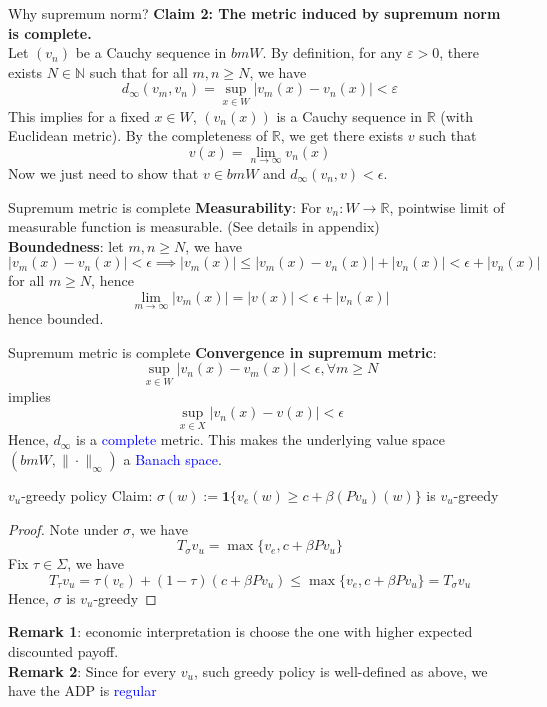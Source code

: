 \documentclass[aspectratio=169]{beamer} %
\begin{document}
\begin{frame}{Why supremum norm?}
\textbf{Claim 2: The metric induced by supremum norm is complete.}\\
Let $(v_n)$ be a Cauchy sequence in $bmW$. By definition, for any $\varepsilon>0$, there exists $N\in \mathbb{N}$ such that for all $m,n\ge N$, we have
$$
d_\infty (v_m,v_n) = \sup_{x\in W}|v_m(x)-v_n(x)|<\varepsilon
$$
This implies for a fixed $x\in W$, $(v_n(x))$ is a Cauchy sequence in $\mathbb{R}$ (with Euclidean metric). By the completeness of $\mathbb{R}$, we get there exists $v$ such that
$$
v(x) = \lim_{n\to\infty }v_n(x)
$$
Now we just need to show that $v\in bmW$ and $d_\infty(v_n,v)<\epsilon$.
\end{frame}
\begin{frame}{Supremum metric is complete}
\textbf{Measurability}: For $v_n:W\to\mathbb{R}$, pointwise limit of measurable function is measurable. (See details in appendix)\\
\textbf{Boundedness}: let $m,n\ge N$, we have
$$
|v_m(x) - v_n(x)|<\epsilon \implies |v_m(x)|\le |v_m(x)-v_n(x)|+|v_n(x)|<\epsilon + |v_n(x)|
$$
for all $m\ge N$, hence
$$
\lim_{m\to\infty}|v_m(x)| = |v(x)|<\epsilon +|v_n(x)|
$$
hence bounded.
\end{frame}
\begin{frame}{Supremum metric is complete}
    \textbf{Convergence in supremum metric}:
    $$
    \sup_{x\in W}|v_n(x)-v_m(x)|<\epsilon,\forall m\ge N
    $$
    implies
    $$
    \sup_{x\in X} |v_n(x)-v(x)| <\epsilon 
    $$
    Hence, $d_\infty$ is a \textcolor{blue}{complete} metric. This makes the underlying value space $(bmW,\|\cdot\|_\infty)$ a \textcolor{blue}{Banach space}.
\end{frame}
\begin{frame}{$v_u$-greedy policy}
    Claim: $\sigma(w):= \mathbf{1}\{v_e(w)\ge c+\beta (Pv_u)(w)\}$ is $v_u$-greedy
    \begin{proof}
    Note under $\sigma$, we have
    $$
    T_\sigma v_u = \max\{v_e , c+\beta Pv_u\}
    $$
        Fix $\tau\in \Sigma$, we have
        $$
        T_\tau v_u = \tau(v_e) + (1-\tau)(c+\beta Pv_u) \le \max\{v_e, c+\beta Pv_u\} = T_\sigma v_u
        $$
    Hence, $\sigma$ is $v_u$-greedy
    \end{proof}
    \textbf{Remark 1}: economic interpretation is choose the one with higher expected discounted payoff.\\
    \textbf{Remark 2}: Since for every $v_u$, such greedy policy is well-defined as above, we have the ADP is \textcolor{blue}{regular}
\end{frame}
\end{document}
